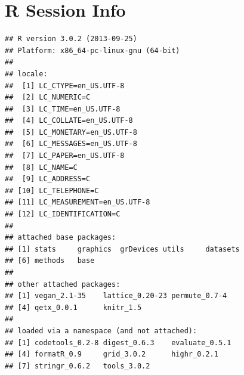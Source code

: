 \documentclass{tufte-book}\usepackage{knitr}
\begin{document}
\chapter{R Session Info}
\begin{knitrout}
\color{fgcolor}\begin{kframe}
\begin{alltt}
\hlstd{()}
\end{alltt}
\begin{verbatim}
## R version 3.0.2 (2013-09-25)
## Platform: x86_64-pc-linux-gnu (64-bit)
## 
## locale:
##  [1] LC_CTYPE=en_US.UTF-8      
##  [2] LC_NUMERIC=C              
##  [3] LC_TIME=en_US.UTF-8       
##  [4] LC_COLLATE=en_US.UTF-8    
##  [5] LC_MONETARY=en_US.UTF-8   
##  [6] LC_MESSAGES=en_US.UTF-8   
##  [7] LC_PAPER=en_US.UTF-8      
##  [8] LC_NAME=C                 
##  [9] LC_ADDRESS=C              
## [10] LC_TELEPHONE=C            
## [11] LC_MEASUREMENT=en_US.UTF-8
## [12] LC_IDENTIFICATION=C       
## 
## attached base packages:
## [1] stats     graphics  grDevices utils     datasets 
## [6] methods   base     
## 
## other attached packages:
## [1] vegan_2.1-35    lattice_0.20-23 permute_0.7-4  
## [4] qetx_0.0.1      knitr_1.5      
## 
## loaded via a namespace (and not attached):
## [1] codetools_0.2-8 digest_0.6.3    evaluate_0.5.1 
## [4] formatR_0.9     grid_3.0.2      highr_0.2.1    
## [7] stringr_0.6.2   tools_3.0.2
\end{verbatim}
\end{kframe}
\end{knitrout}




\begin{fullwidth}

\end{fullwidth}

\printindex
\end{document}

